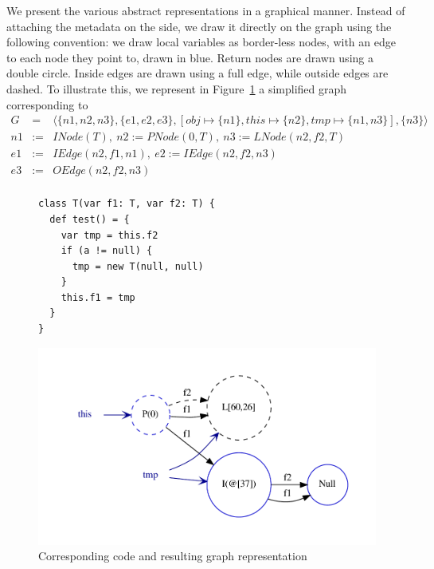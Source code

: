 We present the various abstract representations in a graphical manner. Instead
of attaching the metadata on the side, we draw it directly on the graph using
the following convention: we draw local variables as border-less nodes, with an
edge to each node they point to, drawn in blue. Return nodes are drawn using
a double circle. Inside edges are drawn using a full edge, while
outside edges are dashed. To illustrate this, we represent in
Figure~\ref{fig:pt:graph1} a simplified graph corresponding to %
\begin{eqnarray*}
    G &=& \langle \{n1, n2, n3 \}, \{ e1, e2, e3 \}, [ obj \mapsto \{n1\}, this \mapsto \{n2\}, tmp \mapsto \{ n1, n3 \} ], \{n3\} \rangle  \\
    n1 &:=& INode(T),~  n2 := PNode(0, T),~ n3 := LNode(n2, f2, T) \\
    e1 &:=& IEdge(n2, f1, n1),~ e2 := IEdge(n2, f2, n3) \\
    e3 &:=& OEdge(n2, f2, n3) \\
\end{eqnarray*}

\begin{figure}[h]
    \centering
\begin{minipage}[tl]{0.6\linewidth}
    \centering
\lstset{linewidth=0.6\linewidth}
\begin{lstlisting}
class T(var f1: T, var f2: T) {
  def test() = {
    var tmp = this.f2
    if (a != null) {
      tmp = new T(null, null)
    }
    this.f1 = tmp
  }
}
\end{lstlisting}
\end{minipage}
\begin{minipage}[tl]{0.6\linewidth}
    \centering
    \includegraphics[scale=0.6]{images/pt_graph1}
\end{minipage}
    \caption{Corresponding code and resulting graph representation}
    \label{fig:pt:graph1}
\end{figure}

